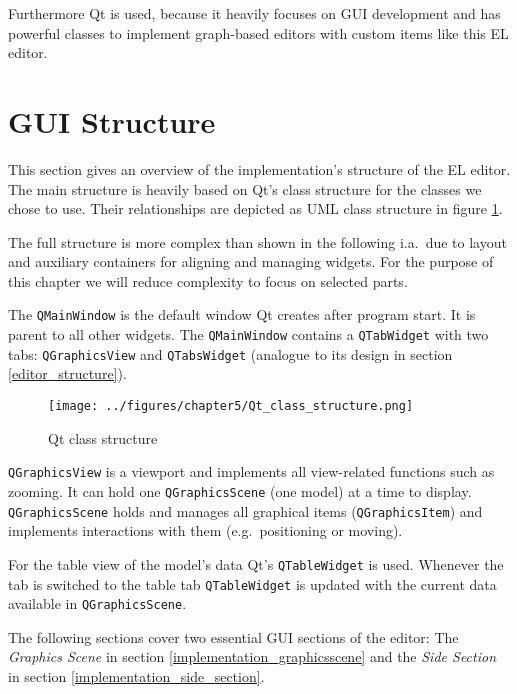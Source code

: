 \documentclass[twoside, openright, 12pt]{book}
\begin{document}
Furthermore Qt is used, because it heavily focuses on GUI development and has powerful classes to implement graph-based editors with custom items like this EL editor.



\section{GUI Structure}
\label{implementation_structure}
This section gives an overview of the implementation's structure of the EL editor.
The main structure is heavily based on Qt's class structure for the classes we chose to use.
Their relationships are depicted as UML class structure in figure \ref{fig:Qt_class_structure}.

\begin{mdframed}[style=mystyle,frametitle=Note]
The full structure is more complex than shown in the following i.a.\ due to layout and auxiliary containers for aligning and managing widgets.
For the purpose of this chapter we will reduce complexity to focus on selected parts.
\end{mdframed}

\noindent
The \texttt{QMainWindow} is the default window Qt creates after program start.
It is parent to all other widgets.
The \texttt{QMainWindow} contains a \texttt{QTabWidget} with two tabs: \texttt{QGraphicsView} and \texttt{QTabsWidget} (analogue to its design in section \ref{editor_structure}).

\begin{figure}[htb]
	\centering
	\texttt{[image: ../figures/chapter5/Qt\_class\_structure.png]}
	\caption{Qt class structure}
	\label{fig:Qt_class_structure}
\end{figure}

\noindent
\texttt{QGraphicsView} is a viewport and implements all view-related functions such as zooming.
It can hold one \texttt{QGraphicsScene} (one model) at a time to display.
\texttt{QGraphicsScene} holds and manages all graphical items (\texttt{QGraphicsItem}) and implements interactions with them (e.g.\ positioning or moving).

For the table view of the model's data Qt's \texttt{QTableWidget} is used.
Whenever the tab is switched to the table tab \texttt{QTableWidget} is updated with the current data available in \texttt{QGraphicsScene}.

The following sections cover two essential GUI sections of the editor: The \textit{Graphics Scene} in section \ref{implementation_graphicsscene} and the \textit{Side Section} in section \ref{implementation_side_section}.
\end{document}

